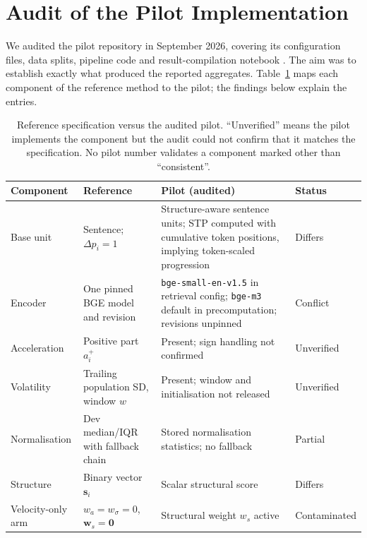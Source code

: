 \documentclass[10pt,a4paper]{article}
\begin{document}
\FloatBarrier
\section{Audit of the Pilot Implementation}
\label{sec:audit}

We audited the pilot repository in September 2026, covering its configuration files, data splits, pipeline code and result-compilation notebook \cite{stpaudit2026}. The aim was to establish exactly what produced the reported aggregates. Table~\ref{tab:reconcile} maps each component of the reference method to the pilot; the findings below explain the entries.

\begin{table}[!htbp]
\caption{Reference specification versus the audited pilot. ``Unverified'' means the pilot implements the component but the audit could not confirm that it matches the specification. No pilot number validates a component marked other than ``consistent''.}
\label{tab:reconcile}
\centering
\footnotesize
\setlength{\tabcolsep}{4pt}
\renewcommand{\arraystretch}{1.05}
\begin{tabularx}{\textwidth}{@{}>{\raggedright\arraybackslash}p{}>{\raggedright\arraybackslash}p{}>{\raggedright\arraybackslash}X>{\raggedright\arraybackslash}p{}@{}}
\toprule
Component & Reference & Pilot (audited) & Status \\
\midrule
Base unit & Sentence; $\Delta p_i=1$ & Structure-aware sentence units; STP computed with cumulative token positions, implying token-scaled progression & Differs \\
Encoder & One pinned BGE model and revision & \texttt{bge-small-en-v1.5} in retrieval config; \texttt{bge-m3} default in precomputation; revisions unpinned & Conflict \\
Acceleration & Positive part $a_i^+$ & Present; sign handling not confirmed & Unverified \\
Volatility & Trailing population SD, window $w$ & Present; window and initialisation not released & Unverified \\
Normalisation & Dev median/IQR with fallback chain & Stored normalisation statistics; no fallback & Partial \\
Structure & Binary vector $\mathbf{s}_i$ & Scalar structural score & Differs \\
Velocity-only arm & $w_a=w_\sigma=0$, $\mathbf{w}_s=\mathbf{0}$ & Structural weight $w_s$ active & Contaminated \\

\end{tabularx}
\end{table}
\end{document}
